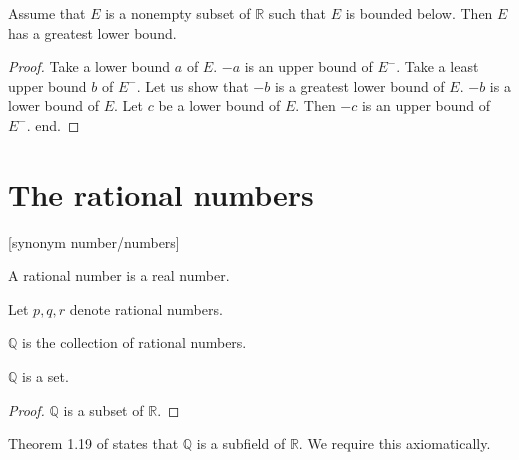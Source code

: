 \documentclass{article}
\begin{document}
\begin{forthel}
\begin{theorem}[1 11] Assume that $E$ is a nonempty subset of $\mathbb{R}$
such that $E$ is bounded below.
Then $E$ has a greatest lower bound.\end{theorem}
\begin{proof}
Take a lower bound $a$ of $E$.
$-a$ is an upper bound of $E^-$.
Take a least upper bound $b$ of $E^-$.
Let us show that $-b$ is a greatest lower bound of $E$.
$-b$ is a lower bound of $E$. Let $c$ be a lower bound of $E$.
Then $-c$ is an upper bound of $E^-$.
end.
\end{proof}

\end{forthel}


\section{The rational numbers}

\begin{forthel}

[synonym number/numbers]

\begin{signature}[1 19a]
A rational number is a real number.
\end{signature}

Let $p,q,r$ denote rational numbers.

\begin{definition}
$\mathbb{Q}$ is the collection of rational numbers.
\end{definition}

\begin{theorem}
$\mathbb{Q}$ is a set.
\end{theorem}
\begin{proof}
$\mathbb{Q}$ is a subset of $\mathbb{R}$.
\end{proof}

\end{forthel}


Theorem 1.19 of \cite{Rudin} states that $\mathbb{Q}$ is a
subfield of $\mathbb{R}$. We require this axiomatically.
\end{document}

